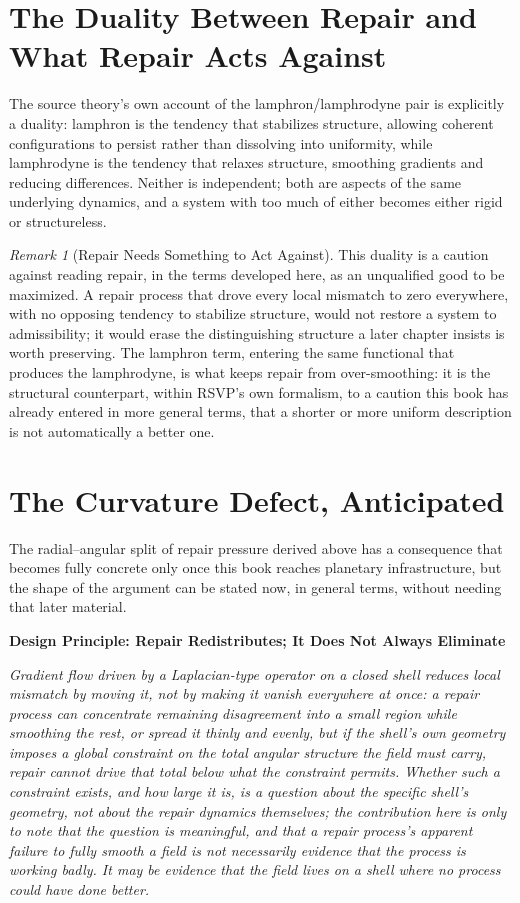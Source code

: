 \documentclass[11pt,fleqn]{book}
\numberwithin{equation}{chapter}
\newenvironment{principle}[1]
  {\begin{principleEnv}
   \noindent\textbf{Design Principle: #1}\par\smallskip\itshape}
  {\end{principleEnv}}
\theoremstyle{plain}
\theoremstyle{definition}
\theoremstyle{remark}
\newtheorem{remark}[theorem]{Remark}
\begin{document}
\section{The Duality Between Repair and What Repair Acts Against}

The source theory's own account of the lamphron/lamphrodyne pair is explicitly a duality: lamphron is the tendency that stabilizes structure, allowing coherent configurations to persist rather than dissolving into uniformity, while lamphrodyne is the tendency that relaxes structure, smoothing gradients and reducing differences. Neither is independent; both are aspects of the same underlying dynamics, and a system with too much of either becomes either rigid or structureless.

\begin{remark}[Repair Needs Something to Act Against]
This duality is a caution against reading repair, in the terms developed here, as an unqualified good to be maximized. A repair process that drove every local mismatch to zero everywhere, with no opposing tendency to stabilize structure, would not restore a system to admissibility; it would erase the distinguishing structure a later chapter insists is worth preserving. The lamphron term, entering the same functional that produces the lamphrodyne, is what keeps repair from over-smoothing: it is the structural counterpart, within RSVP's own formalism, to a caution this book has already entered in more general terms, that a shorter or more uniform description is not automatically a better one.
\end{remark}

\section{The Curvature Defect, Anticipated}

The radial--angular split of repair pressure derived above has a consequence that becomes fully concrete only once this book reaches planetary infrastructure, but the shape of the argument can be stated now, in general terms, without needing that later material.

\begin{principle}{Repair Redistributes; It Does Not Always Eliminate}
Gradient flow driven by a Laplacian-type operator on a closed shell reduces local mismatch by moving it, not by making it vanish everywhere at once: a repair process can concentrate remaining disagreement into a small region while smoothing the rest, or spread it thinly and evenly, but if the shell's own geometry imposes a global constraint on the total angular structure the field must carry, repair cannot drive that total below what the constraint permits. Whether such a constraint exists, and how large it is, is a question about the specific shell's geometry, not about the repair dynamics themselves; the contribution here is only to note that the question is meaningful, and that a repair process's apparent failure to fully smooth a field is not necessarily evidence that the process is working badly. It may be evidence that the field lives on a shell where no process could have done better.
\end{principle}
\end{document}

